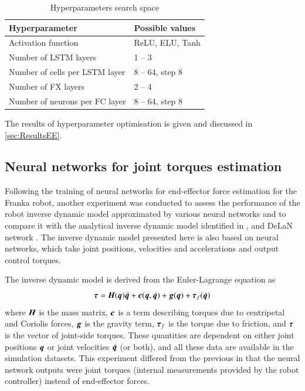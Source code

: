 \begin{table}
    \centering
    \caption{Hyperparameters search space}
    \label{tab:HPSearchSpace}
    \begin{tabular}{ll}
        \toprule
        \textbf{Hyperparameter} & \textbf{Possible values}\\
        \midrule
        Activation function & ReLU, ELU, Tanh \\
        Number of LSTM layers & 1 -- 3 \\ %
        Number of cells per LSTM layer & 8 -- 64, step 8 \\ %
        Number of FX layers & 2 -- 4 \\ %
        Number of neurons per FC layer & 8 -- 64, step 8 \\ %
        \bottomrule
    \end{tabular}
\end{table}

The results of hyperparameter optimisation is given and discussed in \cref{sec:ResultsEE}.

\subsection{Neural networks for joint torques estimation}

Following the training of neural networks for end-effector force estimation for the Franka robot, another experiment was conducted to assess the performance of the robot inverse dynamic model approximated by various neural networks and to compare it with the analytical inverse dynamic model identified in \cite{Gaz2019}, and DeLaN network \cite{Lutter2019}. The inverse dynamic model presented here is also based on neural networks, which take joint positions, velocities and accelerations and output control torques.

The inverse dynamic model is derived from the Euler-Lagrange equation as
\[
    {\bm{\tau}}={\bm{H}}({\bm{q}})\ddot{{\bm{q}}}+{\bm{c}}({\bm{q}},\dot{{\bm{q}}})+{\bm{g}}({\bm{q}})+{\bm{\tau}}_f(\dot{{\bm{q}}})
    \label{eq:InvDyn}
\]
where ${\bm{H}}$ is the mass matrix, ${\bm{c}}$ is a term describing torques due to centripetal and Coriolis forces, ${\bm{g}}$ is the gravity term, ${\bm{\tau}}_f$ is the torque due to friction, and ${\bm{\tau}}$ is the vector of joint-side torques. These quantities are dependent on either joint positions ${\bm{q}}$ or joint velocities $\dot{{\bm{q}}}$ (or both), and all these data are available in the simulation datasets. This experiment differed from the previous in that the neural network outputs were joint torques (internal measurements provided by the robot controller) instead of end-effector forces.

